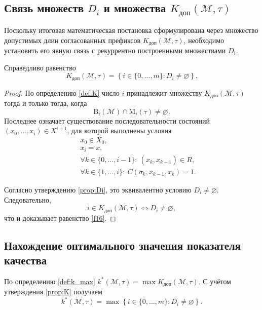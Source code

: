 \subsection{Связь множеств $D_i$ и множества $K_{\mathrm{доп}}(\mathcal{M},\tau)$}

Поскольку итоговая математическая постановка сформулирована через множество
допустимых длин согласованных префиксов $K_{\mathrm{доп}}(\mathcal{M},\tau)$,
необходимо установить его явную связь с рекуррентно построенными множествами
$D_i$.

\begin{proposition}\label{prop:K}
Справедливо равенство
\begin{equation}\label{f16}
K_{\mathrm{доп}}(\mathcal{M},\tau)
=
\left\{
i \in \{0,\dots,m\} : D_i \neq \varnothing
\right\}.
\end{equation}
\end{proposition}

\begin{proof}
По определению \ref{def:K} число $i$ принадлежит множеству
$K_{\mathrm{доп}}(\mathcal{M},\tau)$ тогда и только тогда, когда
\[
\mathrm{B}_i(\mathcal{M}) \cap \mathrm{M}_i(\tau) \neq \varnothing.
\]
Последнее означает существование последовательности состояний
$(x_0,\dots,x_i)\in X^{i+1}$, для которой выполнены условия
\[
\begin{aligned}
&\quad x_0\in X_0,\\
&\quad x_i = x,\\
&\quad\forall k\in\{0,\dots,i-1\}:\ (x_k,x_{k+1})\in R,\\
&\quad\forall k\in\{1,\dots,i\}:\ C(\sigma_k,x_{k-1},x_k)=1.
\end{aligned}
\]

Согласно утверждению \ref{prop:Di}, это эквивалентно условию
$D_i \neq \varnothing$.
Следовательно,
\[
i \in K_{\mathrm{доп}}(\mathcal{M},\tau)
\iff
D_i \neq \varnothing,
\]
что и доказывает равенство \eqref{f16}.
\end{proof}

\subsection{Нахождение оптимального значения показателя качества}

По определению \ref{def:k_max} $k^*(\mathcal{M},\tau) = \max
K_{\mathrm{доп}}(\mathcal{M},\tau)$. С учётом утверждения \ref{prop:K} получаем
\begin{equation}\label{f17}
k^*(\mathcal{M},\tau)
=
\max
\left\{
i \in \{0,\dots,m\} : D_i \neq \varnothing
\right\}.
\end{equation}

